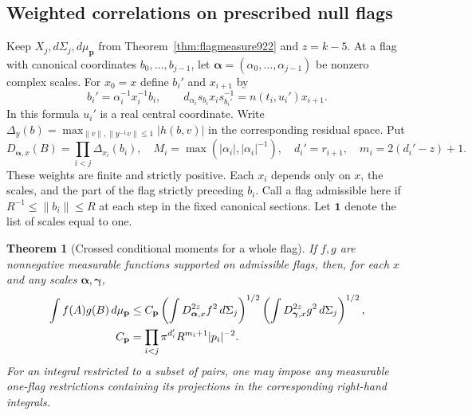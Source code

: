 \documentclass[a4paper,11pt]{article}
\newtheorem{theorem}[proposition]{Theorem}
\theoremstyle{definition}
\theoremstyle{remark}
\numberwithin{equation}{section}
\begin{document}
\subsection{Weighted correlations on prescribed null flags}
\label{sec:flagenergy923}

Keep \(X_j,d\Sigma_j,d\mu_{\mathbf p}\) from
Theorem~\ref{thm:flagmeasure922} and \(z=k-5\). At a flag with
canonical coordinates \(b_0,\ldots,b_{j-1}\), let
\(\boldsymbol\alpha=(\alpha_0,\ldots,\alpha_{j-1})\) be nonzero
complex scales. For \(x_0=x\) define \(b_i'\) and \(x_{i+1}\) by
\[
 b_i'=\alpha_i^{-1}x_i^{-1}b_i,\qquad
 d_{\alpha_i}s_{b_i}x_i s_{b_i'}^{-1}=n(t_i,u_i')x_{i+1}.
\]
In this formula \(u_i'\) is a real central coordinate. Write
\(\Delta_y(b)=\max_{\|v\|,\|y^{-1}v\|\le1}|h(b,v)|\) in
the corresponding residual space. Put
\[
 D_{\boldsymbol\alpha,x}(B)=
 \prod_{i<j}\Delta_{x_i}(b_i),\quad M_i=\max(|\alpha_i|,|\alpha_i|^{-1}),
 \quad d_i'=r_{i+1},\quad m_i=2(d_i'-z)+1 .
\]
These weights are finite and strictly positive. Each \(x_i\)
depends only on \(x\), the scales, and the part of the flag
strictly preceding \(b_i\). Call a flag admissible here if
\(R^{-1}\le\|b_i\|\le R\) at each step in the fixed canonical
sections. Let \(\mathbf1\) denote the list of scales equal to one.

\begin{theorem}[Crossed conditional moments for a whole flag]
\leavevmode\label{thm:crossflags923}
If \(f,g\) are nonnegative measurable functions supported on
admissible flags, then, for each \(x\) and any scales
\(\boldsymbol\alpha,\boldsymbol\gamma\),
\begin{align}
 \int f(A)g(B)\,d\mu_{\mathbf p}
 &\le C_{\mathbf p}
 \left(\int D_{\boldsymbol\alpha,x}^{2z} f^2\,d\Sigma_j\right)^{1/2}
 \left(\int D_{\boldsymbol\gamma,x}^{2z} g^2\,d\Sigma_j\right)^{1/2},
 \label{eq:crossflags923}\\
 C_{\mathbf p}&=\prod_{i<j}
        \pi^{d_i'} R^{m_i+1}|p_i|^{-2}. \notag
\end{align}
For an integral restricted to a subset of pairs, one may impose
any measurable one-flag restrictions containing its projections
in the corresponding right-hand integrals.
\end{theorem}
\end{document}
